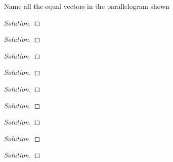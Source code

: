 \begin{exercise}[Stewart {\S}12.3, {\#}3]
Name all the equal vectors in the parallelogram shown
\end{exercise}
\begin{proof}[Solution]
\end{proof}

\begin{exercise}[Stewart {\S}12.3, {\#}5]

\end{exercise}
\begin{proof}[Solution]
\end{proof}

\begin{exercise}[Stewart {\S}12.3, {\#}11]

\end{exercise}
\begin{proof}[Solution]
\end{proof}

\begin{exercise}[Stewart {\S}12.3, {\#}13]
\end{exercise}
\begin{proof}[Solution]
\end{proof}

\begin{exercise}[Stewart {\S}12.3, {\#}17]
\end{exercise}
\begin{proof}[Solution]
\end{proof}

\begin{exercise}[Stewart {\S}12.3, {\#}19]
\end{exercise}
\begin{proof}[Solution]
\end{proof}

\begin{exercise}[Stewart {\S}12.3, {\#}25]
\end{exercise}
\begin{proof}[Solution]
\end{proof}

\begin{exercise}[Stewart {\S}12.3, {\#}26]
\end{exercise}
\begin{proof}[Solution]
\end{proof}

\begin{exercise}
\end{exercise}
\begin{proof}[Solution]
\end{proof}

